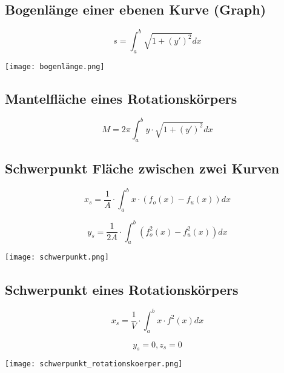 \begin{multicols*}{3}
    \subsection{Bogenlänge einer ebenen Kurve (Graph)}

    \begin{multicols}{2}

        {$$s = \int_{a}^{b}\sqrt{1+(y')^2}dx$$}

        \columnbreak
        \texttt{[image: bogenlänge.png]}


    \end{multicols}

    \subsection{Mantelfläche eines Rotationskörpers}

    {$$M = 2\pi \int_{a}^{b} y \cdot \sqrt{1+(y')^2}dx$$}
    \vfill\null
    \columnbreak
    \subsection{Schwerpunkt Fläche zwischen zwei Kurven}

    \begin{multicols}{2}

        {$$x_s =\frac{1}{A}\cdot \int_{a}^{b}x \cdot(f_o(x)-f_u(x))dx$$}

        {$$y_s =\frac{1}{2A}\cdot \int_{a}^{b}(f_o^2(x)-f_u^2(x))dx$$}

        \columnbreak
        \texttt{[image: schwerpunkt.png]}


    \end{multicols}


    \subsection{Schwerpunkt eines Rotationskörpers}

    \begin{multicols}{2}

        {$$x_s =\frac{1}{V}\cdot \int_{a}^{b}x \cdot f^2(x)dx$$}

        {$$y_s = 0 , z_s = 0$$}

        \columnbreak
        \texttt{[image: schwerpunkt\_rotationskoerper.png]}

    \end{multicols}

    \vfill\null
    \newpage

\end{multicols*}
